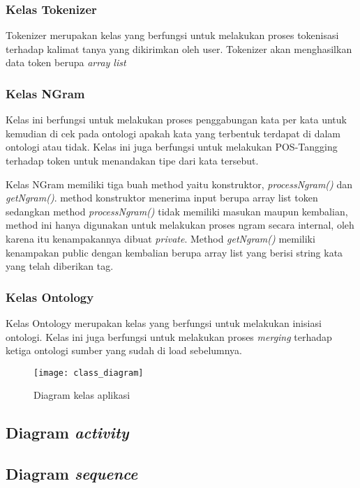 \subsubsection{Kelas Tokenizer}
Tokenizer merupakan kelas yang berfungsi untuk melakukan proses tokenisasi terhadap kalimat tanya yang dikirimkan oleh user. Tokenizer akan menghasilkan data token berupa \emph{array list}
\subsubsection{Kelas NGram}
Kelas ini berfungsi untuk melakukan proses penggabungan kata per kata untuk kemudian di cek pada ontologi apakah kata yang terbentuk terdapat di dalam ontologi atau tidak. Kelas ini juga berfungsi untuk melakukan POS-Tangging terhadap token untuk menandakan tipe dari kata tersebut.

Kelas NGram memiliki tiga buah method yaitu konstruktor, \emph{processNgram()} dan \emph{getNgram()}. method konstruktor menerima input berupa array list token sedangkan method \emph{processNgram()} tidak memiliki masukan maupun kembalian, method ini hanya digunakan untuk melakukan proses ngram secara internal, oleh karena itu kenampakannya dibuat \emph{private}. Method \emph{getNgram()} memiliki kenampakan public dengan kembalian berupa array list yang berisi string kata yang telah diberikan tag.

\subsubsection{Kelas Ontology}
Kelas Ontology merupakan kelas yang berfungsi untuk melakukan inisiasi ontologi. Kelas ini juga berfungsi untuk melakukan proses \emph{merging} terhadap ketiga ontologi sumber yang sudah di load sebelumnya.


\begin{figure}[h]
    \centering
    \texttt{[image: class\_diagram]}
    \caption{Diagram kelas aplikasi}
    \label{fig:class_diagram}
\end{figure}

\subsection{Diagram \emph{activity}}
\subsection{Diagram \emph{sequence}}